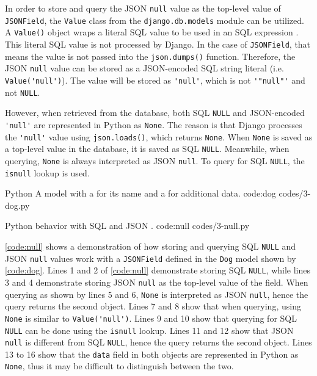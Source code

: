 In order to store and query the JSON \verb|null| value as the top-level value
of \verb|JSONField|, the \verb|Value| class from the \verb|django.db.models|
module can be utilized. A \verb|Value()| object wraps a literal SQL value to be
used in an SQL expression \cite{django:value}. This literal SQL value is not
processed by Django. In the case of \verb|JSONField|, that means the value is
not passed into the \verb|json.dumps()| function. Therefore, the JSON
\verb|null| value can be stored as a JSON-encoded SQL string literal (i.e.
\verb|Value('null')|). The value will be stored as \verb|'null'|, which is
not \verb|'"null"'| and not \verb|NULL|.

However, when retrieved from the database, both SQL \verb|NULL| and
JSON-encoded \verb|'null'| are represented in Python as \verb|None|. The reason
is that Django processes the \verb|'null'| value using \verb|json.loads()|,
which returns \verb|None|. When \verb|None| is saved as a top-level value in
the database, it is saved as SQL \verb|NULL|. Meanwhile, when querying,
\verb|None| is always interpreted as JSON \verb|null|. To query for SQL
\verb|NULL|, the \verb|isnull| lookup is used.

\listing
{Python}
{A  model with a  for its name and a 
for additional data.}
{code:dog}
{codes/3-dog.py}

\listing
{Python}
{ behavior with SQL  and JSON .}
{code:null}
{codes/3-null.py}

\autoref{code:null} shows a demonstration of how storing and querying SQL
\verb|NULL| and JSON \verb|null| values work with a \verb|JSONField| defined in
the \verb|Dog| model shown by \autoref{code:dog}. Lines 1 and 2 of
\autoref{code:null} demonstrate storing SQL \verb|NULL|, while lines 3 and 4
demonstrate storing JSON \verb|null| as the top-level value of the field. When
querying as shown by lines 5 and 6, \verb|None| is interpreted as JSON
\verb|null|, hence the query returns the second object. Lines 7 and 8 show that
when querying, using \verb|None| is similar to \verb|Value('null')|. Lines 9
and 10 show that querying for SQL \verb|NULL| can be done using the
\verb|isnull| lookup. Lines 11 and 12 show that JSON \verb|null| is different
from SQL \verb|NULL|, hence the query returns the second object. Lines 13 to 16
show that the \verb|data| field in both objects are represented in Python as
\verb|None|, thus it may be difficult to distinguish between the two.

